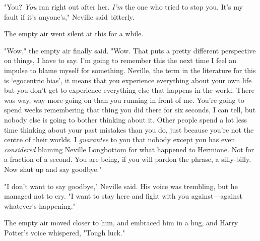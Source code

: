 "You? \emph{You} ran right out after her. \emph{I'm} the one who tried to stop
you. It's my fault if it's anyone's," Neville said bitterly.

The empty air went silent at this for a while.

"Wow," the empty air finally said. "Wow. That puts a pretty different
perspective on things, I have to say. I'm going to remember this the next time
I feel an impulse to blame myself for something. Neville, the term in the
literature for this is `egocentric bias', it means that you experience
everything about your own life but you don't get to experience everything else
that happens in the world. There was way, way more going on than you running in
front of me. You're going to spend weeks remembering that thing you did there
for six seconds, I can tell, but nobody else is going to bother thinking about
it. Other people spend a lot less time thinking about your past mistakes than
you do, just because you're not the centre of their worlds. I \emph{guarantee}
to you that nobody except you has even \emph{considered} blaming Neville
Longbottom for what happened to Hermione. Not for a fraction of a second. You
are being, if you will pardon the phrase, a silly-billy. Now shut up and say
goodbye."

"I don't want to say goodbye," Neville said. His voice was trembling, but he
managed not to cry. "I want to stay here and fight with you against---against
whatever's happening."

The empty air moved closer to him, and embraced him in a hug, and Harry
Potter's voice whispered, "Tough luck."
